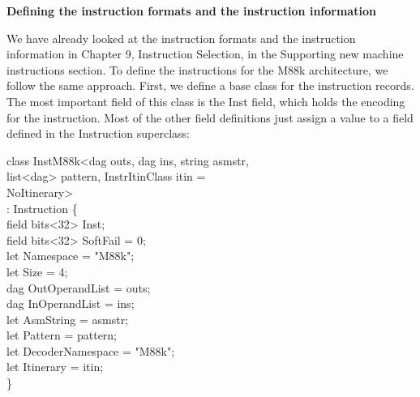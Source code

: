 \hspace*{\fill} \par %
\textbf{Defining the instruction formats and the instruction information}

We have already looked at the instruction formats and the instruction information in Chapter 9, Instruction Selection, in the Supporting new machine instructions section. To define the instructions for the M88k architecture, we follow the same approach. First, we define a base class for the instruction records. The most important field of this class is the Inst field, which holds the encoding for the instruction. Most of the other field definitions just assign a value to a field defined in the Instruction superclass:\par

\begin{tcolorbox}[colback=white,colframe=black]
class InstM88k<dag outs, dag ins, string asmstr, \\
\hspace*{2cm}list<dag> pattern, InstrItinClass itin = \\
\hspace*{2.5cm}NoItinerary> \\
\hspace*{1.3cm}: Instruction \{ \\
\hspace*{1cm}field bits<32> Inst; \\
\hspace*{1cm}field bits<32> SoftFail = 0; \\
\hspace*{1cm}let Namespace = "M88k"; \\
\hspace*{1cm}let Size = 4; \\
\hspace*{1cm}dag OutOperandList = outs; \\
\hspace*{1cm}dag InOperandList = ins; \\ 
\hspace*{1cm}let AsmString = asmstr; \\
\hspace*{1cm}let Pattern = pattern; \\
\hspace*{1cm}let DecoderNamespace = "M88k"; \\
\hspace*{1cm}let Itinerary = itin; \\
\}
\end{tcolorbox}

